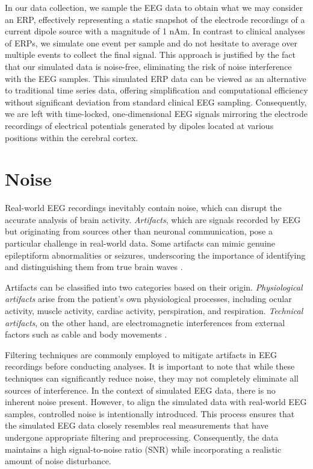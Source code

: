 \documentclass[a4paper, UKenglish, 11pt]{uiomaster}
\begin{document}
In our data collection, we sample the EEG data to obtain what we may consider an ERP, effectively representing a static snapshot of the electrode recordings of a current dipole source with a magnitude of 1 nAm. In contrast to clinical analyses of ERPs, we simulate one event per sample and do not hesitate to average over multiple events to collect the final signal. This approach is justified by the fact that our simulated data is noise-free, eliminating the risk of noise interference with the EEG samples. This simulated ERP data can be viewed as an alternative to traditional time series data, offering simplification and computational efficiency without significant deviation from standard clinical EEG sampling. Consequently, we are left with time-locked, one-dimensional EEG signals mirroring the electrode recordings of electrical potentials generated by dipoles located at various positions within the cerebral cortex.


\section{Noise} \label{chap:noise}
Real-world EEG recordings inevitably contain noise, which can disrupt the accurate analysis of brain activity. \emph{Artifacts}, which are signals recorded by EEG but originating from sources other than neuronal communication, pose a particular challenge in real-world data. Some artifacts can mimic genuine epileptiform abnormalities or seizures, underscoring the importance of identifying and distinguishing them from true brain waves \cite{sazgar2019eeg}.

Artifacts can be classified into two categories based on their origin. \emph{Physiological artifacts} arise from the patient's own physiological processes, including ocular activity, muscle activity, cardiac activity, perspiration, and respiration. \emph{Technical artifacts}, on the other hand, are electromagnetic interferences from external factors such as cable and body movements \cite{bitbrain}.

Filtering techniques are commonly employed to mitigate artifacts in EEG recordings before conducting analyses. It is important to note that while these techniques can significantly reduce noise, they may not completely eliminate all sources of interference. In the context of simulated EEG data, there is no inherent noise present. However, to align the simulated data with real-world EEG samples, controlled noise is intentionally introduced. This process ensures that the simulated EEG data closely resembles real measurements that have undergone appropriate filtering and preprocessing. Consequently, the data maintains a high signal-to-noise ratio (SNR) while incorporating a realistic amount of noise disturbance.
\end{document}
